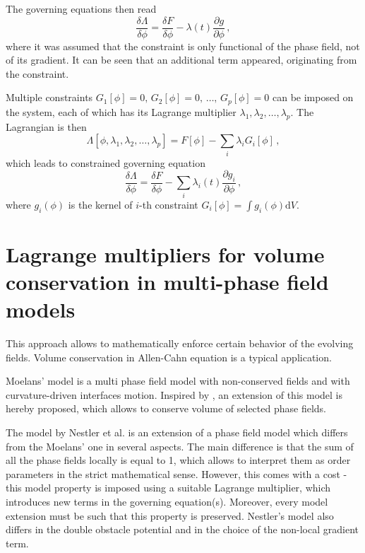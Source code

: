 The governing equations then read
\begin{equation}
\frac{\delta \Lambda}{\delta \phi} = \frac{\delta F}{\delta \phi} - \lambda(t)\frac{\partial g}{\partial \phi}\,, 
\end{equation}
where it was assumed that the constraint is only functional of the phase field, not of its gradient. It can be seen that an additional term appeared, originating from the constraint. 

Multiple constraints $G_1[\phi]=0,\,G_2[\phi]=0,\, \dots,\,G_p[\phi]=0$ can be imposed on the system, each of which has its Lagrange multiplier $\lambda_1,\lambda_2,\dots,\lambda_p$. The Lagrangian is then 
\begin{equation}
\Lambda[\phi,\lambda_1,\lambda_2,\dots,\lambda_p] = F[\phi] - \sum_i\lambda_i
G_i[\phi] \,,
\end{equation}
which leads to constrained governing equation
\begin{equation}
\frac{\delta \Lambda}{\delta \phi} = \frac{\delta F}{\delta \phi} - \sum_i\lambda_i(t)\frac{\partial g_i}{\partial \phi} \,,
\end{equation}
where $g_i(\phi)$ is the kernel of $i$-th constraint $G_i[\phi]=\int g_i(\phi)\mathrm{d}V$. 

\section*{Lagrange multipliers for volume conservation in multi-phase field models}
This approach allows to mathematically enforce certain behavior of the evolving fields. Volume conservation in Allen-Cahn equation is a typical application.

Moelans' model is a multi phase field model with non-conserved fields and with curvature-driven interfaces motion. Inspired by \cite{Nestler2008}, an extension of this model is hereby proposed, which allows to conserve volume of selected phase fields.

The model by Nestler et al. \cite{Nestler2008} is an extension of a phase field model which differs from the Moelans' one in several aspects. The main difference is that the sum of all the phase fields locally is equal to 1, which allows to interpret them as order parameters in the strict mathematical sense. However, this comes with a cost - this model property is imposed using a suitable Lagrange multiplier, which introduces new terms in the governing equation(s). Moreover, every model extension must be such that this property is preserved. Nestler's model also differs in the double obstacle potential and in the choice of the non-local gradient term.  

